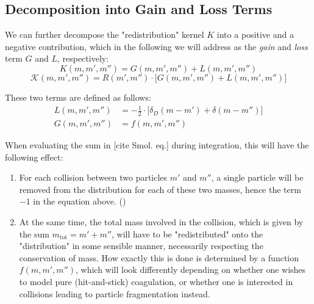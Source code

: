 
    \clearpage\subsection{Decomposition into Gain and Loss Terms}

        We can further decompose the "redistribution" kernel $K$ into a positive and a negative
        contribution, which in the following we will address as the \textit{gain} and \textit{loss} 
        term $G$ and $L$, respectively:
        \begin{equation}
            K(m,m',m'') = G(m, m', m'') + L(m, m', m'')
        \end{equation}
        \begin{equation}
            \mathcal K(m,m',m'') = R(m',m'') \cdot \bigg[G(m, m', m'') + L(m, m', m'')\bigg]
        \end{equation}

        These two terms are defined as follows:
        \begin{align}
            L(m, m', m'') &= -\frac{1}{2} \cdot \bigg[\delta_D(m-m')+\delta(m-m'')\bigg] \\
            G(m, m', m'') &= f(m, m', m'')
        \end{align}

        When evaluating the sum in [cite Smol. eq.] during integration, this will have the following 
        effect:
        \begin{enumerate}
            \item For each collision between two particles $m'$ and $m''$, a single particle will 
                be removed from the distribution for each of these two masses, hence the term $-1$ 
                in the equation above. ()
            \item At the same time, the total mass involved in the collision, which is given by the 
                sum $m_\text{tot} = m' + m''$, will have to be "redistributed" onto the "distribution" 
                in some sensible manner, necessarily respecting the conservation of mass. How exactly 
                this is done is determined by a function $f(m,m',m'')$, which will look differently 
                depending on whether one wishes to model pure (hit-and-stick) coagulation, or
                whether one is interested in collisions leading to particle fragmentation instead.
        \end{enumerate}

